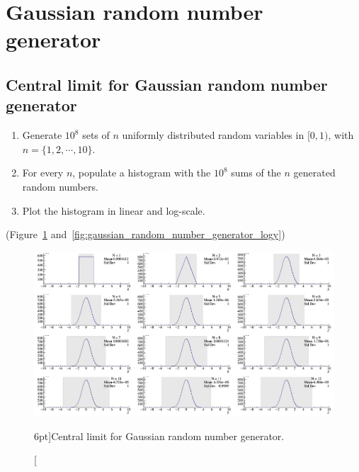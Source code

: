 

\newpage

\section{Gaussian random number generator}
\label{exer:gaussian_random_number_generator}

\subsection{Central limit for Gaussian random number generator}

\begin{enumerate}
	\item Generate $10^{8}$ sets of $n$ uniformly distributed random variables in $[0, 1)$, with $n = \{ 1, 2, \cdots,10 \}$.
	\item For every $n$, populate a histogram with the $10^{8}$ sums of the $n$ generated random numbers.
	\item Plot the histogram in linear and log-scale. 
\end{enumerate}

(Figure~\ref{fig:gaussian_random_number_generator} and~\ref{fig:gaussian_random_number_generator_logy})

\begin{figure}
	\includegraphics{exercise/gaussian_random_number_generator.png}
	\caption[Central limit for Gaussian random number generator.][6pt]{Central limit for Gaussian random number generator.}
	\label{fig:gaussian_random_number_generator}
\end{figure}

